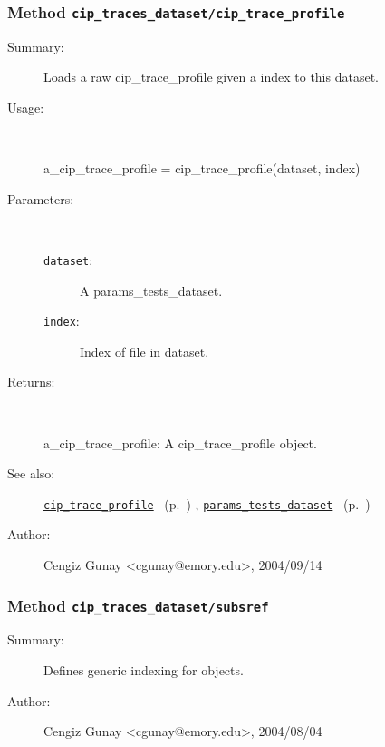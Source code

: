 \subsubsection[Method \texttt{cip\_trace\_profile}]{Method \texttt{cip\_traces\_dataset/cip\_trace\_profile}}%
%
\label{ref_cip_traces_dataset__cip_trace_profile}%
\hypertarget{ref_cip_traces_dataset__cip_trace_profile}{}%
\begin{description}
\item[Summary:]Loads a raw cip\_trace\_profile given a index 
		      to this dataset.
%
\item[Usage:]~%
\begin{lyxcode}%
a\_cip\_trace\_profile = cip\_trace\_profile(dataset, index)
%
\end{lyxcode}%
%
%
\item[Parameters:]~
\begin{description}%
\item[\texttt{dataset}:]
 A params\_tests\_dataset.
\item[\texttt{index}:]
 Index of file in dataset.
\end{description}%
%
\item[Returns:]~

	a\_cip\_trace\_profile: A cip\_trace\_profile object.
%
%
\item[See also:]%
\hyperlink{ref_cip_trace_profile}{\texttt{cip\_trace\_profile}}%
\ (p.~\pageref{ref_cip_trace_profile})%
%
, \hyperlink{ref_params_tests_dataset}{\texttt{params\_tests\_dataset}}%
\ (p.~\pageref{ref_params_tests_dataset})%
%
%
\item[Author:]%
Cengiz Gunay <cgunay@emory.edu>, 2004/09/14%
\end{description}
\methodline%
\subsubsection[Method \texttt{subsref}]{Method \texttt{cip\_traces\_dataset/subsref}}%
%
\label{ref_cip_traces_dataset__subsref}%
\hypertarget{ref_cip_traces_dataset__subsref}{}%
\begin{description}
\item[Summary:]Defines generic indexing for objects.
%
%
%
%
%
%
%
\item[Author:]%
Cengiz Gunay <cgunay@emory.edu>, 2004/08/04%
\end{description}
\methodline%
